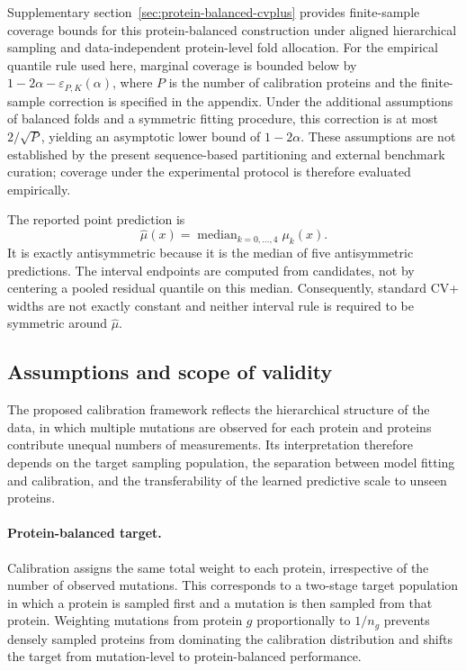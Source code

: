 \documentclass[11pt]{article}
\begin{document}
Supplementary section~\ref{sec:protein-balanced-cvplus} provides finite-sample
coverage bounds for this protein-balanced construction under aligned
hierarchical sampling and data-independent protein-level fold allocation.
For the empirical quantile rule used here, marginal coverage is bounded
below by $1-2\alpha-\varepsilon_{P,K}(\alpha)$, where $P$ is the number
of calibration proteins and the finite-sample correction is specified
in the appendix. Under the additional assumptions of balanced folds
and a symmetric fitting procedure, this correction is at most
$2/\sqrt{P}$, yielding an asymptotic lower bound of $1-2\alpha$.
These assumptions are not established by the present sequence-based
partitioning and external benchmark curation; coverage under the
experimental protocol is therefore evaluated empirically.



The reported point prediction is
\begin{equation}
\widehat\mu(x)=\operatorname{median}_{k=0,\ldots,4}\mu_k(x).
\end{equation}
It is exactly antisymmetric because it is the median of five antisymmetric predictions.
The interval endpoints are computed from candidates, not by centering a pooled residual
quantile on this median. Consequently, standard CV+ widths are not exactly constant and
neither interval rule is required to be symmetric around $\widehat\mu$.

\subsection{Assumptions and scope of validity}

The proposed calibration framework reflects the hierarchical structure of the data, in which multiple mutations are observed for each protein and proteins contribute unequal numbers of measurements. Its interpretation therefore depends on the target sampling population, the separation between model fitting and calibration, and the transferability of the learned predictive scale to unseen proteins.

\paragraph{Protein-balanced target.}
Calibration assigns the same total weight to each protein, irrespective of the number of observed mutations. This corresponds to a two-stage target population in which a protein is sampled first and a mutation is then sampled from that protein. Weighting mutations from protein \(g\) proportionally to \(1/n_g\) prevents densely sampled proteins from dominating the calibration distribution and shifts the target from mutation-level to protein-balanced performance.
\end{document}

